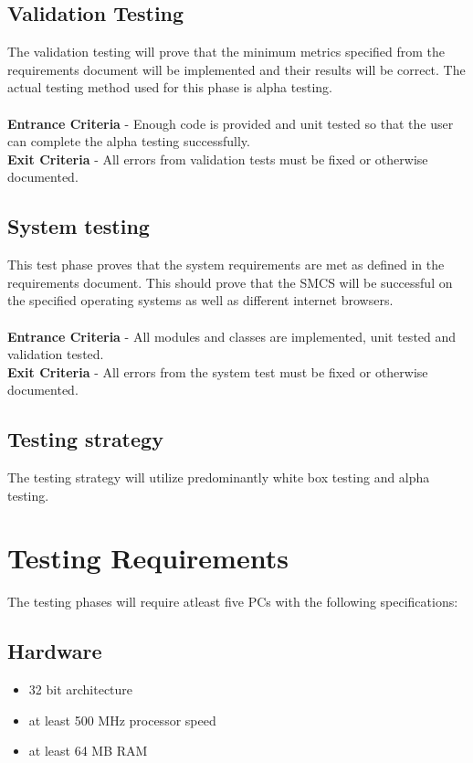 \documentclass{scrreprt}
\begin{document}
	\section{Validation Testing}
	The validation testing will prove that the minimum metrics specified from the requirements document will be implemented and their results will be correct. The actual testing method used for this phase is alpha testing.\\\\
	\textbf{Entrance Criteria} - Enough code is provided and unit tested so that the user can complete the alpha testing successfully.\\
	\textbf{Exit Criteria} - All errors from validation tests must be fixed or otherwise documented.
	
	\section{System testing}
	This test phase proves that the system requirements are met as defined in the requirements document. This should prove that the SMCS will be successful on the specified operating systems as well as different internet browsers.\\\\
	\textbf{Entrance Criteria} - All modules and classes are implemented, unit tested and validation tested.\\
	\textbf{Exit Criteria} - All errors from the system test must be fixed or otherwise documented.
	
	\section{Testing strategy}
	The testing strategy will utilize predominantly white box testing and alpha testing.

	{\let\clearpage\relax \chapter{Testing Requirements}}
	The testing phases will require atleast five PCs with the following specifications:
	\section{Hardware}
	\begin{itemize}
		\item 32 bit architecture
		\item at least 500 MHz processor speed
		\item at least 64 MB RAM
	\end{itemize}
\end{document}
